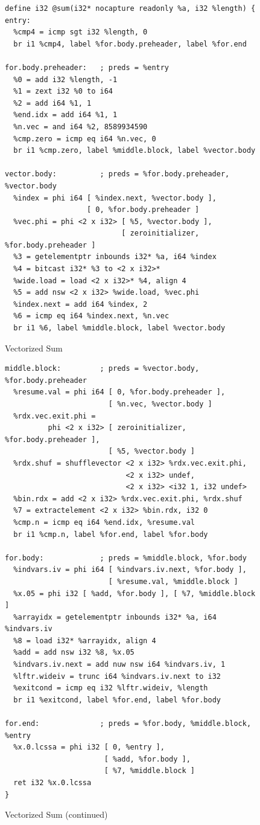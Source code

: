 \documentclass[a4paper,bibliography=totocnumbered,parskip,headsepline]{scrbook}
\begin{document}
\begin{figure}[!htpb]
\caption{Vectorized Sum}
\label{fig:sumllvec}
\begin{lstlisting}
define i32 @sum(i32* nocapture readonly %a, i32 %length) {
entry:
  %cmp4 = icmp sgt i32 %length, 0
  br i1 %cmp4, label %for.body.preheader, label %for.end

for.body.preheader:   ; preds = %entry
  %0 = add i32 %length, -1
  %1 = zext i32 %0 to i64
  %2 = add i64 %1, 1
  %end.idx = add i64 %1, 1
  %n.vec = and i64 %2, 8589934590
  %cmp.zero = icmp eq i64 %n.vec, 0
  br i1 %cmp.zero, label %middle.block, label %vector.body

vector.body:          ; preds = %for.body.preheader, %vector.body
  %index = phi i64 [ %index.next, %vector.body ],
                   [ 0, %for.body.preheader ]
  %vec.phi = phi <2 x i32> [ %5, %vector.body ],
                           [ zeroinitializer, %for.body.preheader ]
  %3 = getelementptr inbounds i32* %a, i64 %index
  %4 = bitcast i32* %3 to <2 x i32>*
  %wide.load = load <2 x i32>* %4, align 4
  %5 = add nsw <2 x i32> %wide.load, %vec.phi
  %index.next = add i64 %index, 2
  %6 = icmp eq i64 %index.next, %n.vec
  br i1 %6, label %middle.block, label %vector.body
\end{lstlisting}
\end{figure}

\begin{figure}
\ContinuedFloat
\begin{lstlisting}
middle.block:         ; preds = %vector.body, %for.body.preheader
  %resume.val = phi i64 [ 0, %for.body.preheader ],
                        [ %n.vec, %vector.body ]
  %rdx.vec.exit.phi =
          phi <2 x i32> [ zeroinitializer, %for.body.preheader ],
                        [ %5, %vector.body ]
  %rdx.shuf = shufflevector <2 x i32> %rdx.vec.exit.phi,
                            <2 x i32> undef,
                            <2 x i32> <i32 1, i32 undef>
  %bin.rdx = add <2 x i32> %rdx.vec.exit.phi, %rdx.shuf
  %7 = extractelement <2 x i32> %bin.rdx, i32 0
  %cmp.n = icmp eq i64 %end.idx, %resume.val
  br i1 %cmp.n, label %for.end, label %for.body

for.body:             ; preds = %middle.block, %for.body
  %indvars.iv = phi i64 [ %indvars.iv.next, %for.body ],
                        [ %resume.val, %middle.block ]
  %x.05 = phi i32 [ %add, %for.body ], [ %7, %middle.block ]
  %arrayidx = getelementptr inbounds i32* %a, i64 %indvars.iv
  %8 = load i32* %arrayidx, align 4
  %add = add nsw i32 %8, %x.05
  %indvars.iv.next = add nuw nsw i64 %indvars.iv, 1
  %lftr.wideiv = trunc i64 %indvars.iv.next to i32
  %exitcond = icmp eq i32 %lftr.wideiv, %length
  br i1 %exitcond, label %for.end, label %for.body

for.end:              ; preds = %for.body, %middle.block, %entry
  %x.0.lcssa = phi i32 [ 0, %entry ],
                       [ %add, %for.body ],
                       [ %7, %middle.block ]
  ret i32 %x.0.lcssa
}
\end{lstlisting}
\caption[]{Vectorized Sum (continued)}
\end{figure}
\end{document}
